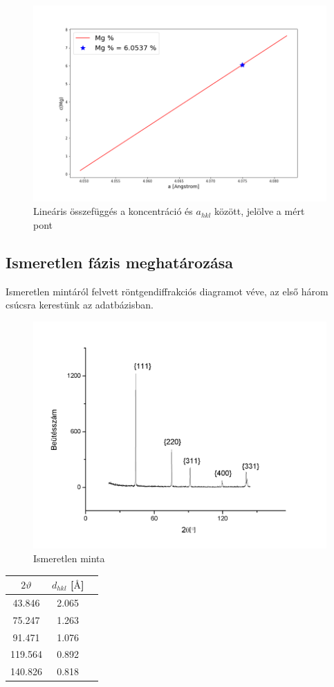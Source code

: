 \documentclass[a4paper,12pt]{article}
\begin{document}
\begin{figure}[H]
\centering
\includegraphics[width=.96\textwidth]{./konc.png}
\caption{Lineáris összefüggés a koncentráció és $a_{hkl}$ között, jelölve a mért pont}
\end{figure} 

\subsection{ Ismeretlen fázis meghatározása}

\par Ismeretlen mintáról felvett röntgendiffrakciós diagramot véve, az első három csúcsra kerestünk az adatbázisban. 

\begin{figure}[H]
\centering
\includegraphics[width=.5\textwidth]{./fel3.png}
\caption{Ismeretlen minta}
\end{figure}

\begin{center}
\begin{tabular}{|c|c|c|}
\hline
$2\vartheta$ & $d_{hkl}$ [$\si{\angstrom}$] \\
\hline
43.846 & 2.065 \\
\hline
75.247 & 1.263  \\
\hline
91.471 & 1.076 \\
\hline
119.564 & 0.892 \\
\hline
140.826 & 0.818\\
\hline
\end{tabular}
\end{center}
\end{document}
